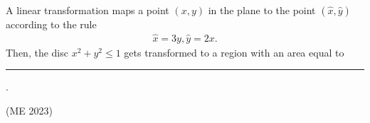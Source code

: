\item A linear transformation maps a point $(x, y)$ in the plane to the point $(\hat{x}, \hat{y})$ according to the rule
\begin{align*}
 \hat{x} = 3y, \hat{y} = 2x. 
\end{align*}
Then, the disc $x^2 + y^2 \leq 1$ gets transformed to a region with an area equal to  \rule{1cm}{0.01pt}.

\hfill (ME 2023)
